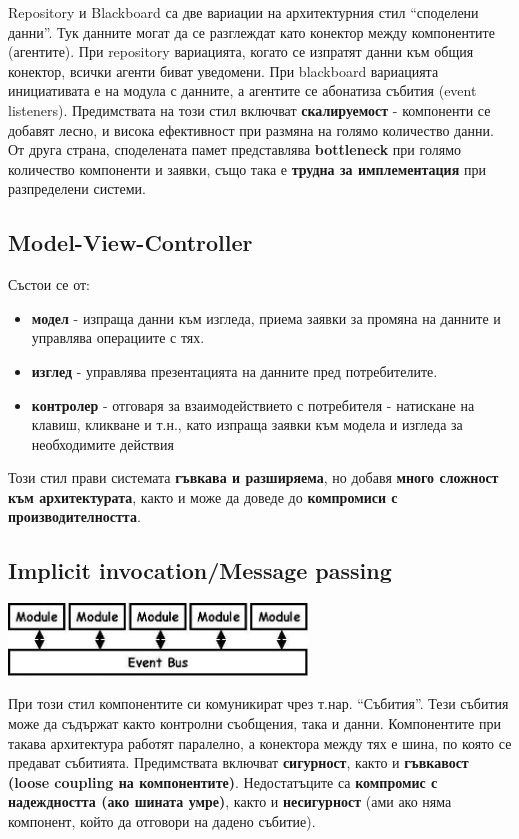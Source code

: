 \documentclass[fleqn,12pt]{article}
\begin{document}
Repository и Blackboard са две вариации на архитектурния стил “споделени данни”.
Тук данните могат да се разглеждат като конектор между компонентите (агентите).
При repository вариацията, когато се изпратят данни към общия конектор, всички агенти биват уведомени.
При blackboard вариацията инициативата е на модула с данните, а агентите се абонатиза събития (event listeners).
\bigbreak
Предимствата на този стил включват \textbf{скалируемост} - компоненти се добавят лесно, и висока ефективност при размяна на голямо количество данни.
От друга страна, споделената памет представлява \textbf{bottleneck} при голямо количество компоненти и заявки, също така е \textbf{трудна за имплементация} при разпределени системи.

\subsection{Model-View-Controller}
Състои се от:
\begin{itemize}
    \item \textbf{модел} - изпраща данни към изгледа, приема заявки за промяна на данните и управлява операциите с тях.
    \item \textbf{изглед} - управлява презентацията на данните пред потребителите.
    \item \textbf{контролер} - отговаря за взаимодействието с потребителя - натискане на клавиш, кликване и т.н., като изпраща заявки към модела и изгледа за необходимите действия
\end{itemize}

Този стил прави системата \textbf{гъвкава и разширяема}, но добавя \textbf{много сложност към архитектурата}, както и може да доведе до \textbf{компромиси с производителността}.

\subsection{Implicit invocation/Message passing}
\begin{center} \includegraphics[width=300px]{implicit_invocation.jpg} \end{center}

При този стил компонентите си комуникират чрез т.нар. “Събития”. Тези събития може да съдържат както контролни съобщения, така и данни. Компонентите при такава архитектура работят паралелно, а конектора между тях е шина, по която се предават събитията.
\bigbreak
Предимствата включват \textbf{сигурност}, както и \textbf{гъвкавост (loose coupling на компонентите)}.
Недостатъците са \textbf{компромис с надеждността (ако шината умре)}, както и \textbf{несигурност} (ами ако няма компонент, който да отговори на дадено събитие).
\end{document}
